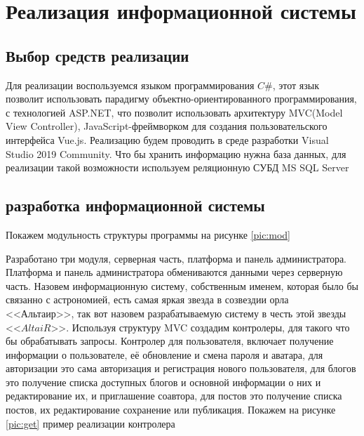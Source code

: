\section{Реализация информационной системы}
\subsection{Выбор средств реализации}

Для реализации воспользуемся языком программирования $C\#$, этот язык позволит использовать парадигму объектно-ориентированного программирования, с технологией ASP.NET, что позволит использовать архитектуру MVC(Model View Controller), JavaScript-фреймворком для создания пользовательского интерфейса Vue.js. Реализацию будем проводить в среде разработки Visual Studio 2019 Community. Что бы хранить информацию нужна база данных, для реализации такой возможности используем реляционную СУБД MS SQL Server

\subsection{разработка информационной системы}

Покажем модульность структуры программы на рисунке \ref{pic:mod}



Разработано три модуля, серверная часть, платформа и панель администратора. Платформа и панель администратора обмениваются данными через серверную часть. Назовем информационную систему, собственным именем, которая было бы связанно с астрономией, есть самая яркая звезда в созвездии орла <<Альтаир>>, так вот назовем разрабатываемую систему в честь этой звезды <<$AltaiR$>>. Используя структуру MVC создадим контролеры, для такого что бы обрабатывать запросы. Контролер для пользователя, включает получение информации о пользователе, её обновление и смена пароля и аватара, для авторизации это сама авторизация и регистрация нового пользователя, для блогов это получение списка доступных блогов и основной информации о них и редактирование их, и приглашение соавтора, для постов это получение списка постов, их редактирование сохранение или публикация. Покажем на рисунке \ref{pic:get} пример реализации контролера



\pagebreak